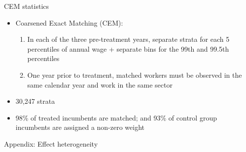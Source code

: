 \documentclass[aspectratio=169]{beamer}
\begin{document}
\begin{frame}{CEM statistics \hyperlink{treatment}{}} \label{CEM_stats}
\begin{itemize}
\item Coarsened Exact Matching (CEM): \medskip
\begin{enumerate}
\item In each of the three pre-treatment years, separate strata for each 5 percentiles of annual wage + separate bins for the 99th and 99.5th percentiles \medskip
\item One year prior to treatment, matched workers must be observed in the same calendar year and work in the same sector
\end{enumerate} \medskip
\item 30,247 strata \medskip
\item 98\% of treated incumbents are matched; and 93\% of control group incumbents are assigned a non-zero weight
\end{itemize}
\end{frame}

\begin{frame}
\begin{center}
{\Large Appendix: Effect heterogeneity}
\end{center}
\end{frame}
\end{document}
